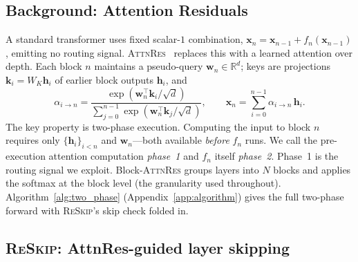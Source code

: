 \documentclass{article}
\newcommand{\attnres}{\textsc{AttnRes}}
\newcommand{\reskip}{\textsc{ReSkip}}
\newcommand{\R}{\mathbb{R}}
\begin{document}
\subsection{Background: Attention Residuals}
\label{sec:background}

A standard transformer uses fixed scalar-$1$ combination, $\mathbf{x}_n = \mathbf{x}_{n-1} + f_n(\mathbf{x}_{n-1})$, emitting no routing signal. \attnres{}~\citep{chen2026attnres} replaces this with a learned attention over depth. Each block $n$ maintains a pseudo-query $\mathbf{w}_n \in \R^d$; keys are projections $\mathbf{k}_i = W_K \mathbf{h}_i$ of earlier block outputs $\mathbf{h}_i$, and
\begin{equation}
  \alpha_{i \to n} = \frac{\exp(\mathbf{w}_n^\top \mathbf{k}_i / \sqrt{d})}{\sum_{j=0}^{n-1} \exp(\mathbf{w}_n^\top \mathbf{k}_j / \sqrt{d})},
  \qquad
  \mathbf{x}_n = \sum_{i=0}^{n-1} \alpha_{i \to n}\,\mathbf{h}_i .
  \label{eq:attnres}
\end{equation}
The key property is two-phase execution. Computing the input to block $n$ requires only $\{\mathbf{h}_i\}_{i<n}$ and $\mathbf{w}_n$---both available \emph{before} $f_n$ runs. We call the pre-execution attention computation \emph{phase~1} and $f_n$ itself \emph{phase~2}. Phase~1 is the routing signal we exploit. Block-\attnres{} groups layers into $N$ blocks and applies the softmax at the block level (the granularity used throughout). Algorithm~\ref{alg:two_phase} (Appendix~\ref{app:algorithm}) gives the full two-phase forward with \reskip{}'s skip check folded in.

\subsection{\reskip{}: AttnRes-guided layer skipping}
\label{sec:reskip}
\end{document}
